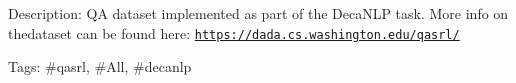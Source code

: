 Description\+: QA dataset implemented as part of the Deca\+N\+LP task. More info on thedataset can be found here\+: \href{https://dada.cs.washington.edu/qasrl/}{\tt https\+://dada.\+cs.\+washington.\+edu/qasrl/}

Tags\+: \#qasrl, \#\+All, \#decanlp 